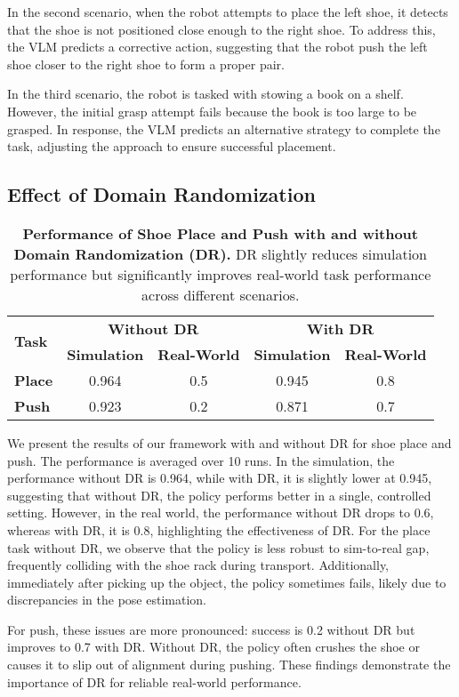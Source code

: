In the second scenario, when the robot attempts to place the left shoe, it detects that the shoe is not positioned close enough to the right shoe. To address this, the VLM predicts a corrective action, suggesting that the robot push the left shoe closer to the right shoe to form a proper pair.

In the third scenario, the robot is tasked with stowing a book on a shelf. However, the initial grasp attempt fails because the book is too large to be grasped. In response, the VLM predicts an alternative strategy to complete the task, adjusting the approach to ensure successful placement.

\subsection{Effect of Domain Randomization} \label{sec:dr}
\begin{table}[ht]
    \centering
    \begin{tabular}{lcccc}
        \toprule
        \multirow{2}{*}{\textbf{Task}} & \multicolumn{2}{c}{\textbf{Without DR}} & \multicolumn{2}{c}{\textbf{With DR}} \\
        \cmidrule(lr){2-3} \cmidrule(lr){4-5}
         & \textbf{Simulation} & \textbf{Real-World} & \textbf{Simulation} & \textbf{Real-World} \\
        \midrule
        \textbf{Place} & 0.964 & 0.5 & 0.945 & 0.8 \\
        \textbf{Push} & 0.923 & 0.2 & 0.871 & 0.7 \\
        \bottomrule
    \end{tabular}
    \caption{\small{\textbf{Performance of Shoe Place and Push with and without Domain Randomization (DR).} DR slightly reduces simulation performance but significantly improves real-world task performance across different scenarios.}}
    \label{tab:domain_randomization_results}
    \vspace{-2.5em}
\end{table}

We present the results of our framework with and without DR for shoe place and push. The performance is averaged over 10 runs. In the simulation, the performance without DR is 0.964, while with DR, it is slightly lower at 0.945, suggesting that without DR, the policy performs better in a single, controlled setting. However, in the real world, the performance without DR drops to 0.6, whereas with DR, it is 0.8, highlighting the effectiveness of DR. For the place task without DR, we observe that the policy is less robust to sim-to-real gap, frequently colliding with the shoe rack during transport. Additionally, immediately after picking up the object, the policy sometimes fails, likely due to discrepancies in the pose estimation.

For push, these issues are more pronounced: success is 0.2 without DR but improves to 0.7 with DR. Without DR, the policy often crushes the shoe or causes it to slip out of alignment during pushing. These findings demonstrate the importance of DR for reliable real-world performance.

